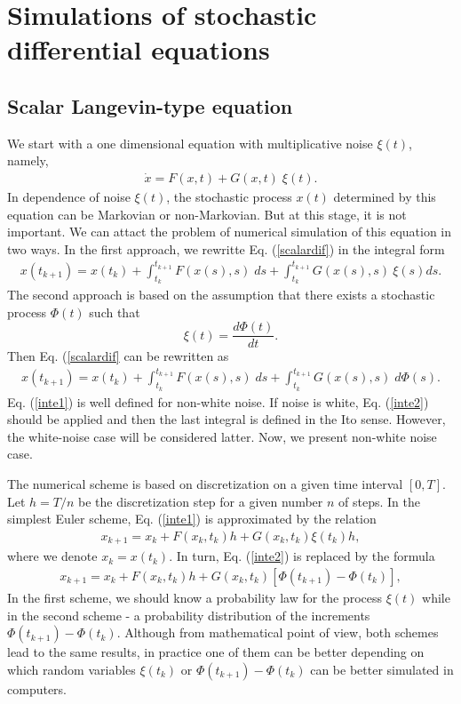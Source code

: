 \documentclass[authoryear,draft,1p,times]{elsarticle}
\newcommand{\be}{\begin{equation}}
\newcommand{\ee}{\end{equation}}
\renewcommand{\=}{\stackrel{\mathrm{d}}{=}}
\begin{document}
\section{Simulations of stochastic differential equations}

 
\subsection{Scalar Langevin-type equation} 

We  start with a one dimensional  equation  with multiplicative noise  $\xi(t)$, namely,  
%
\begin{eqnarray}
\label{scalar1}
\dot x =   F(x, t) + G(x, t) \;  \xi (t).  
\end{eqnarray}
%
In dependence of noise $\xi(t)$, the stochastic process $x(t)$  determined by this equation 
 can be  Markovian or non-Markovian. But at this stage, it is not important.  
We can attact the problem of numerical simulation  of this equation in two ways. 
In the first approach, we rewritte  Eq. (\ref{scalardif})  in the   integral  form 
%
\begin{eqnarray}
\label{inte1}
x(t_{k+1}) = x(t_k) +  \int_{t_k}^{t_{k+1}}  F(x(s), s) \;ds +  
\int_{t_k}^{t_{k+1}}  G(x(s), s) \  \xi(s) ds. 
\end{eqnarray}
%
The second approach is based on the assumption that there exists a stochastic process $\Phi(t)$ such that 
%
\be
\label{Phi}
\xi(t)=\frac{d\Phi(t)}{dt}.
\ee
%
Then Eq. (\ref{scalardif} can be rewritten as  
%
\begin{eqnarray}
\label{inte2}
x(t_{k+1}) = x(t_k) +  \int_{t_k}^{t_{k+1}}  F(x(s), s) \;ds +  
\int_{t_k}^{t_{k+1}}  G(x(s), s) \;d\Phi(s).
\end{eqnarray}
%
Eq. (\ref{inte1}) is well defined for non-white noise. If noise is white,  Eq. (\ref{inte2}) should be applied and then  the last integral is defined in the Ito sense.  However, the white-noise case will be considered latter. Now, we present non-white noise case. 

The numerical scheme is based on discretization on a given time interval $[0, T]$. Let 
$h=T/n$ be the discretization step for a given number $n$ of steps.
In the simplest Euler scheme,  Eq. (\ref{inte1}) 
is approximated by the  relation  
%
\begin{eqnarray}
\label{rek1}
x_{k+1} = x_k + F(x_k, t_k) h + G(x_k, t_k)  \xi(t_k)  h,
\end{eqnarray}
%
where  we  denote $x_k =x(t_k)$.  In turn,  Eq. (\ref{inte2}) 
is replaced  by the formula  
%
\begin{eqnarray}
\label{rek2}
x_{k+1} = x_k + F(x_k, t_k) h + G(x_k, t_k)  [ \Phi(t_{k+1}) -\Phi(t_k)] ,
\end{eqnarray}
%
In the first  scheme,  we should know a probability law for the process $\xi(t)$ while in the second scheme - a  probability distribution  of the increments  $ \Phi(t_{k+1}) -\Phi(t_k)$.  
Although from mathematical point of view, both schemes lead to the same results, in practice  one of them can be better depending on which random variables  $\xi(t_k)$ or $ \Phi(t_{k+1}) -\Phi(t_k)$ 
can be better simulated in computers. 
\end{document}
